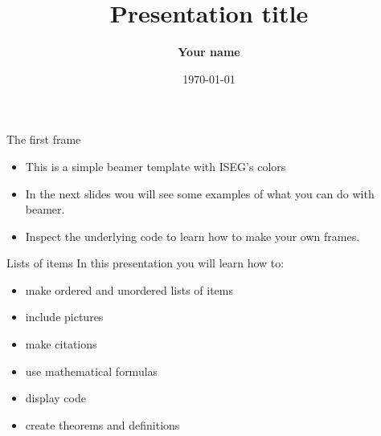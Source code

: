 


\title[Presentation title]{Presentation title}

\author[Your name]{\textbf {Your name}}

\date{\today}






\begin{frame}{The first frame}
	\begin{itemize}
		\item This is a simple beamer template with ISEG's colors
		\item In the next slides wou will see some examples of what you can do with beamer.
		\item Inspect the underlying code to learn how to make your own frames.
	\end{itemize}
\end{frame}

\begin{frame}{Lists of items}
	In this presentation you will learn how to:
	\begin{itemize}
	\item make ordered and unordered lists of items
	\item include pictures
	\item make citations
	\item use mathematical formulas
	\item display code
	\item create theorems and definitions
	\end{itemize}
\end{frame}

